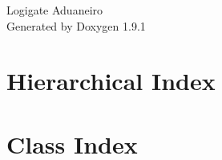 \let\mypdfximage\pdfximage\def\pdfximage{\immediate\mypdfximage}\documentclass[twoside]{book}
\newcommand{\+}{\discretionary{\mbox{\scriptsize$\hookleftarrow$}}{}{}}
\newcommand{\clearemptydoublepage}{%
  \newpage{\pagestyle{empty}\cleardoublepage}%
}
\begin{document}
\raggedbottom

\hypersetup{pageanchor=false,
             bookmarksnumbered=true,
             pdfencoding=unicode
            }
\begin{titlepage}
\vspace*{7cm}
\begin{center}%
{\Large Logigate Aduaneiro }\\
\vspace*{1cm}
{\large Generated by Doxygen 1.9.1}\\
\end{center}
\end{titlepage}
\clearemptydoublepage
{}
\tableofcontents
\clearemptydoublepage
{}
\hypersetup{pageanchor=true}

\chapter{Hierarchical Index}

\chapter{Class Index}

\end{document}

